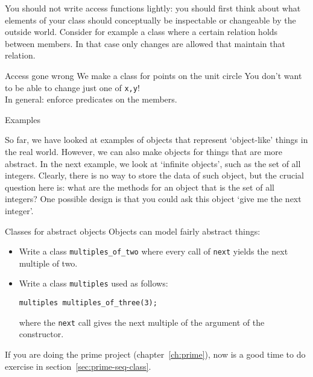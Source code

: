 You should not write access functions lightly: you should first think
about what elements of your class should conceptually be inspectable
or changeable by the outside world.  Consider for example a class
where a certain relation holds between members. In that case only
changes are allowed that maintain that relation.

\begin{block}{Access gone wrong}
  \label{sl:privatenogoo}
  We make a class for points on the unit circle
  You don't want to be able to change just one of \lstinline{x,y}!\\
  In general: enforce predicates on the members.
\end{block}

 {Examples}

So far, we have looked at examples of objects that represent
`object-like' things in the real world.
However, we can also make objects for things
that are more abstract.
In the next example, we look at `infinite objects',
such as the set of all integers.
Clearly, there is no way to store the data of such object,
but the crucial question here is: what are the methods
for an object that is the set of all integers?
One possible design is that you could ask this object
`give me the next integer'.

\begin{block}{Classes for abstract objects}
  \label{sl:intstream}
  Objects can model fairly abstract things:
\end{block}

\begin{exercise}
  \label{ex:mult-two}
  \begin{itemize}
  \item
    Write a class \lstinline{multiples_of_two} where every call of
    \lstinline{next} yields the next multiple of two. 
  \item Write a class \lstinline{multiples} used as follows:
\begin{lstlisting}
multiples multiples_of_three(3);      
\end{lstlisting}
  where the \lstinline{next} call gives the next multiple of the
  argument of the constructor.
  \end{itemize}
\end{exercise}

\begin{exercise}
  If you are doing the prime project (chapter~\ref{ch:prime}),
  now is a good time to do exercise in section~\ref{sec:prime-seq-class}.
\end{exercise}

